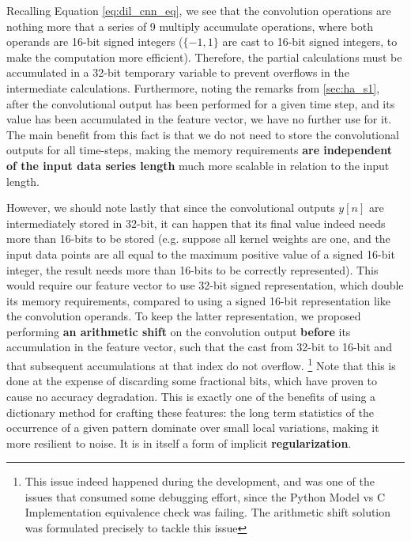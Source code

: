         Recalling Equation \ref{eq:dil_cnn_eq}, we see that the convolution operations are nothing more that a series of 9 multiply accumulate operations, 
        where both operands are 16-bit signed integers ($\{-1,1\}$ are cast to 16-bit signed integers, to make the computation more efficient). Therefore, the partial calculations
        must be accumulated in a 32-bit temporary variable to prevent overflows in the intermediate calculations. Furthermore, noting the remarks from \ref{sec:ha_s1}, after the convolutional
        output has been performed for a given time step, and its value has been accumulated in the feature vector, we have no further use for it. The main benefit from this fact is that we do not 
        need to store the convolutional outputs for all time-steps, making the memory requirements \textbf{are independent of the input data series length} much more scalable in relation to the input length.

        However, we should note lastly that since the convolutional outputs $y[n]$ are intermediately stored in 32-bit, it can happen that its final value indeed needs more than 16-bits to be stored
        (e.g. suppose all kernel weights are one, and the input data points are all equal to the maximum positive value of a signed 16-bit integer, the result needs more than 16-bits to be correctly represented).
        This would require our feature vector to use 32-bit signed representation, which double its memory requirements, compared to using a signed 16-bit representation like the convolution operands. To keep the latter
        representation, we proposed performing \textbf{an arithmetic shift} on the convolution output \textbf{before} its accumulation in the feature vector, such that the cast from 32-bit to 16-bit and that subsequent accumulations at that index do not overflow.
        \footnote{This issue indeed happened during the development, and was one of the issues that consumed some debugging effort, since the Python Model vs C Implementation equivalence check was failing. 
        The arithmetic shift solution was formulated precisely to tackle this issue}
        Note that this is done at the expense of discarding some fractional bits, which have proven to cause no accuracy degradation. This is exactly one of the benefits of using a dictionary method for crafting these features: the
        long term statistics of the occurrence of a given pattern dominate over small local variations, making it more resilient to noise. It is in itself a form of implicit \textbf{regularization}.

